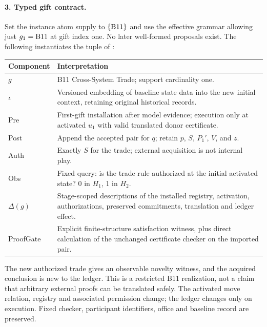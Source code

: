 \documentclass[11pt]{article}
\theoremstyle{definition}\newtheorem{definition}[theorem]{Definition}
\begin{document}
\paragraph{3. Typed gift contract.} Set the instance atom supply to $\{\mathrm{B11}\}$ and use the effective grammar allowing just $g_1=\mathrm{B11}$ at gift index one. No later well-formed proposals exist. The following instantiates the tuple of \cite[Def.~7.1]{gift}:
\begin{center}\small
\begin{tabular}{@{}p{.19\linewidth}p{.73\linewidth}@{}}
\toprule Component & Interpretation\\\midrule
$g$ & B11 Cross-System Trade; support cardinality one.\\
$\iota$ & Versioned embedding of baseline state data into the new initial context, retaining original historical records.\\
Pre & First-gift installation after model evidence; execution only at activated $u_1$ with valid translated donor certificate.\\
Post & Append the accepted pair for $q$; retain $p$, $S$, $P_1'$, $V$, and $z$.\\
Auth & Exactly $S$ for the trade; external acquisition is not internal play.\\
Obs & Fixed query: is the trade rule authorized at the initial activated state? 0 in $H_1$, 1 in $H_2$.\\
$\Delta(g)$ & Stage-scoped descriptions of the installed registry, activation, authorizations, preserved commitments, translation and ledger effect.\\
ProofGate & Explicit finite-structure satisfaction witness, plus direct calculation of the unchanged certificate checker on the imported pair.\\\bottomrule
\end{tabular}\end{center}
The new authorized trade gives an observable novelty witness, and the acquired conclusion is new to the ledger. This is a restricted B11 realization, not a claim that arbitrary external proofs can be translated safely. The activated move relation, registry and associated permission change; the ledger changes only on execution. Fixed checker, participant identifiers, office and baseline record are preserved.
\end{document}
